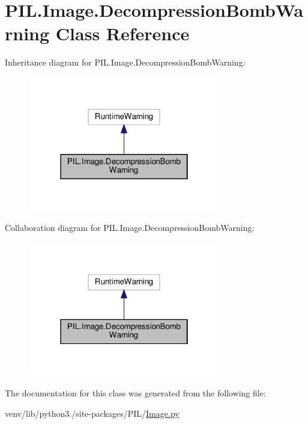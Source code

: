 \hypertarget{classPIL_1_1Image_1_1DecompressionBombWarning}{}\section{P\+I\+L.\+Image.\+Decompression\+Bomb\+Warning Class Reference}
\label{classPIL_1_1Image_1_1DecompressionBombWarning}


Inheritance diagram for P\+I\+L.\+Image.\+Decompression\+Bomb\+Warning\+:
\nopagebreak
\begin{figure}[H]
\begin{center}
\leavevmode
\includegraphics[width=238pt]{classPIL_1_1Image_1_1DecompressionBombWarning__inherit__graph}
\end{center}
\end{figure}


Collaboration diagram for P\+I\+L.\+Image.\+Decompression\+Bomb\+Warning\+:
\nopagebreak
\begin{figure}[H]
\begin{center}
\leavevmode
\includegraphics[width=238pt]{classPIL_1_1Image_1_1DecompressionBombWarning__coll__graph}
\end{center}
\end{figure}


The documentation for this class was generated from the following file\+:\begin{DoxyCompactItemize}
\item 
venv/lib/python3./site-\/packages/\+P\+I\+L/\hyperlink{Image_8py}{Image.\+py}\end{DoxyCompactItemize}
